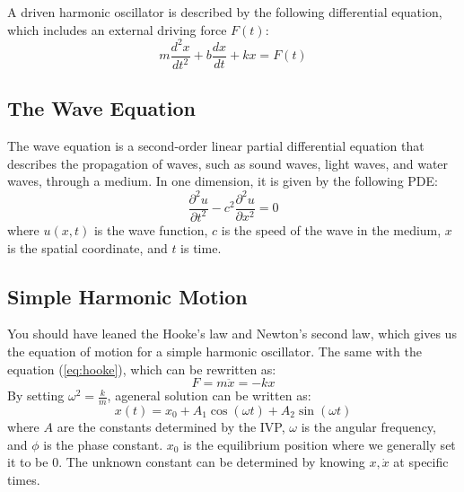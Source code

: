 \documentclass[11pt]{report}
\begin{document}
\begin{definition}
    A driven harmonic oscillator is described by the following differential equation, which includes an external driving force $F(t)$:
    \begin{equation}
        m \frac{d^2 x}{dt^2} + b \frac{dx}{dt} + kx = F(t)   
    \end{equation}
\end{definition}
\subsection{The Wave Equation}

\begin{definition}
    The wave equation is a second-order linear partial differential equation that describes the propagation of waves, such as sound waves, light waves, and water waves, through a medium. In one dimension, it is given by the following PDE:
    \begin{equation}
        \frac{\partial^2 u}{\partial t^2} - c^2 \frac{\partial^2 u}{\partial x^2} = 0
    \end{equation}
    where \( u(x,t) \) is the wave function, \( c \) is the speed of the wave in the medium, \( x \) is the spatial coordinate, and \( t \) is time.
\end{definition}

\subsection{Simple Harmonic Motion}
\begin{definition}
    You should have leaned the Hooke's law and Newton's second law, which gives us the equation of motion for a simple harmonic oscillator. The same with the equation (\ref{eq:hooke}), which can be rewritten as:
    \begin{equation}
        F = m\ddot{x} = -kx
    \end{equation}
    By setting $\omega^2 = \frac{k}{m}$, ageneral solution can be written as:
    \begin{equation}
        x(t) = x_0 + A_1 \cos(\omega t) + A_2 \sin(\omega t)
    \end{equation}
    where \( A \) are the constants determined by the IVP, \( \omega \) is the angular frequency, and \( \phi \) is the phase constant. $x_0$ is the equilibrium position where we generally set it to be 0. The unknown constant can be determined by knowing $x, \dot{x}$ at specific times.
\end{definition}
\end{document}

